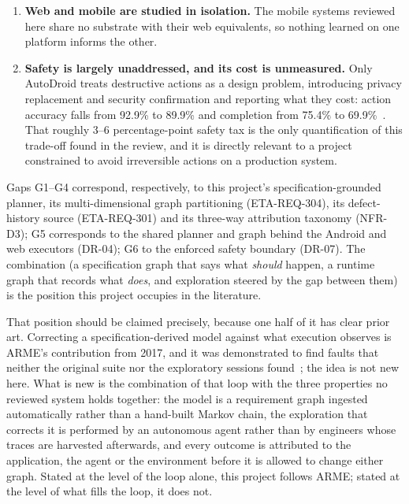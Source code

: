 \begin{enumerate}[label=\textbf{G\arabic*.},leftmargin=3.0em]
    these systems distinguishes ``the application is wrong'' from ``the agent
    could not drive the application'' from ``the environment blocked the test'',
    even though the three demand completely different responses and only the
    first is a defect report.
  \item \textbf{Web and mobile are studied in isolation.} The mobile systems
    reviewed here share no substrate with their web equivalents, so nothing
    learned on one platform informs the other.
  \item \textbf{Safety is largely unaddressed, and its cost is unmeasured.}
    Only AutoDroid treats destructive actions as a design problem, introducing
    privacy replacement and security confirmation and reporting what they cost:
    action accuracy falls from 92.9\% to 89.9\% and completion from 75.4\% to
    69.9\%~\cite{autodroid}. That roughly 3--6 percentage-point safety tax is the
    only quantification of this trade-off found in the review, and it is directly
    relevant to a project constrained to avoid irreversible actions on a
    production system.
\end{enumerate}

Gaps G1--G4 correspond, respectively, to this project's specification-grounded
planner, its multi-dimensional graph partitioning (ETA-REQ-304), its
defect-history source (ETA-REQ-301) and its three-way attribution taxonomy
(NFR-D3); G5 corresponds to the shared planner and graph behind the Android and
web executors (DR-04); G6 to the enforced safety boundary (DR-07). The
combination (a specification graph that says what \emph{should} happen, a
runtime graph that records what \emph{does}, and exploration steered by the gap
between them) is the position this project occupies in the literature.

That position should be claimed precisely, because one half of it has clear
prior art. Correcting a specification-derived model against what execution
observes is ARME's contribution from 2017, and it was demonstrated to find
faults that neither the original suite nor the exploratory sessions
found~\cite{arme}; the idea is not new here. What is new is the combination of
that loop with the three properties no reviewed system holds together: the
model is a requirement graph ingested automatically rather than a hand-built
Markov chain, the exploration that corrects it is performed by an autonomous
agent rather than by engineers whose traces are harvested afterwards, and every
outcome is attributed to the application, the agent or the environment before
it is allowed to change either graph. Stated at the level of the loop alone,
this project follows ARME; stated at the level of what fills the loop, it does
not.

